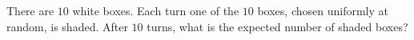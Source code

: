 There are $10$ white boxes. Each turn one of the $10$ boxes, chosen uniformly at random, is shaded. After $10$ turns, what is the expected number of shaded boxes?
